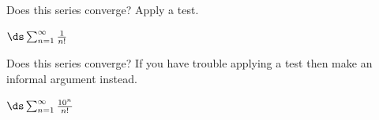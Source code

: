 Does this series converge?  Apply a test.

\quad $\ds \sum_{n=1}^\infty \frac{1}{n!}$

\vspace{30mm}

Does this series converge?  If you have trouble applying a test then make an informal argument instead.

\quad $\ds \sum_{n=1}^\infty \frac{10^n}{n!}$
